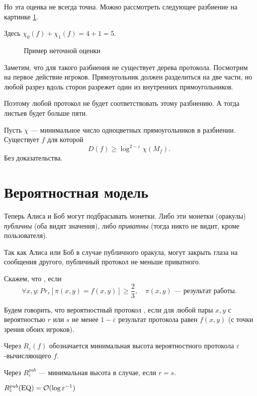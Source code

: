 Но эта оценка не всегда точна. Можно рассмотреть следующее разбиение на картинке \ref{fig:bad-rect}. 

Здесь $ \chi_0(f)  + \chi_1(f) = 4 + 1 = 5$.
\begin{figure}[h]
    \centering
    \caption{Пример неточной оценки}
    \label{fig:bad-rect}
\end{figure}
Заметим, что для такого разбиения не существует дерева протокола. Посмотрим на первое действие игроков. Прямоугольник должен разделиться на две части, но любой разрез вдоль сторон разрежет один из внутренних прямоугольников.

Поэтому любой протокол не будет соответствовать этому разбиению. А тогда листьев будет больше пяти.

\vspace{1.5em}
\begin{thm}[G,PW 16]
Пусть $ \chi$ --- минимальное число одноцветных прямоугольников в разбиении.
	Существует $ f$ для которой
	 \[
		 D(f) \ge \log^{2 - \varepsilon } \chi (M_f)
	.\] 
	Без доказательства.
\end{thm}

\section{Вероятностная модель}
Теперь Алиса и Боб могут подбрасывать монетки. Либо эти монетки (оракулы) \textit{публичны} (оба видят значения), либо \textit{приватны} (тогда никто не видит, кроме пользователя).

Так как Алиса или Боб в случае публичного оракула, могут закрыть глаза на сообщения другого, публичный протокол не меньше приватного.

Скажем, что , если 
\[
	\forall x, y \colon Pr_{r}[\pi(x, y) = f(x, y)] \ge \frac{2}{3}, \quad \pi(x, y) \text{ --- результат работы}
.\] 
\begin{defn}[]
	Будем говорить, что вероятностный протокол , если для любой пары $ x, y$ с вероятностью  $ r$ или  $ s$ не менее  $ 1 - \varepsilon $ результат протокола равен $ f(x, y)$ (с точки зрения обоих игроков).

	Через  $ R_{ \varepsilon }(f) $ обозначается минимальная высота вероятностного протокола $ \varepsilon $-вычисляющего $ f$. 

	Через $ R_{ \varepsilon }^{pub}$ --- минимальная высота в случае, если $ r = s$.
\end{defn}
\begin{lm}
	$ R^{pub}_{ \varepsilon } (\operatorname{EQ}) = \mathcal{O}( \log \varepsilon ^{-1})$
\end{lm}

